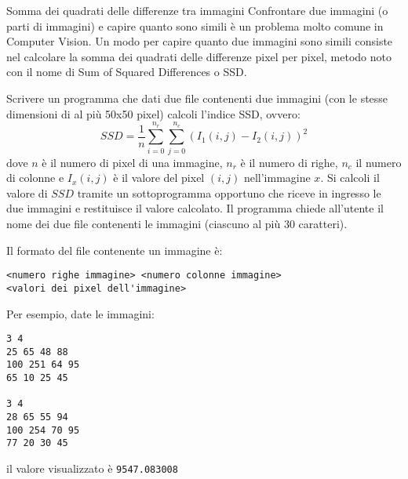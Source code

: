 \begin{labex}{Somma dei quadrati delle differenze tra immagini}
Confrontare due immagini (o parti di immagini) e capire quanto sono simili \`e un problema molto comune in Computer Vision. Un modo per capire quanto due immagini sono simili consiste nel calcolare la somma dei quadrati delle differenze pixel per pixel, metodo noto con il nome di Sum of Squared Differences o SSD.

Scrivere un programma che dati due file contenenti due immagini (con le stesse dimensioni di al pi\`u 50x50 pixel) calcoli l'indice SSD, ovvero:
\begin{equation}
 SSD = \frac{1}{n} \sum_{i=0}^{n_r} \sum_{j=0}^{n_c} (I_1(i,j)-I_2(i,j))^2
\end{equation}
dove $n$ \`e il numero di pixel di una immagine, $n_r$ \`e il numero di righe, $n_c$ il numero di colonne e $I_x(i,j)$ \`e il valore del pixel $(i,j)$ nell'immagine $x$.
Si calcoli il valore di $SSD$ tramite un sottoprogramma opportuno che riceve in ingresso le due immagini e restituisce il valore calcolato.
Il programma chiede all'utente il nome dei due file contenenti le immagini (ciascuno al pi\`u 30 caratteri).

Il formato del file contenente un immagine \`e:
\begin{verbatim}
<numero righe immagine> <numero colonne immagine>
<valori dei pixel dell'immagine>
\end{verbatim}

Per esempio, date le immagini:
\begin{verbatim}
3 4
25 65 48 88
100 251 64 95
65 10 25 45

3 4
28 65 55 94
100 254 70 95
77 20 30 45
\end{verbatim}
il valore visualizzato \`e \texttt{9547.083008}

\begin{labexinout}
\end{labexinout}

\end{labex}


